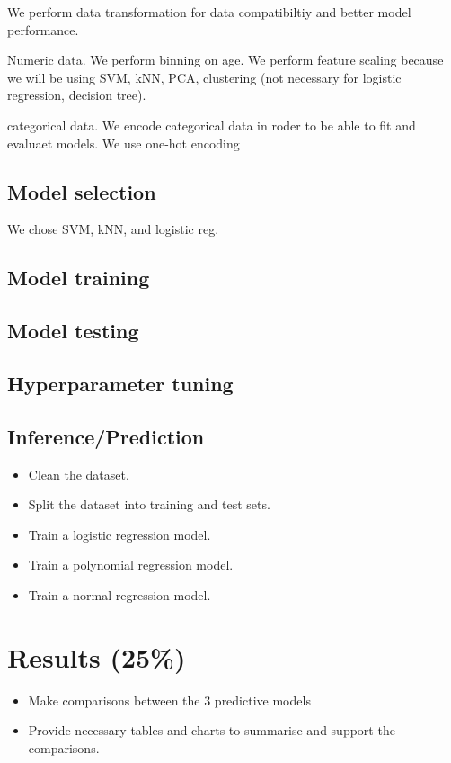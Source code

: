 \documentclass[twoside,11pt]{article}
\begin{document}
We perform data transformation for data compatibiltiy and better model performance.

Numeric data. We perform binning on age. We perform feature scaling because we will be using SVM, kNN, PCA, clustering (not necessary for logistic regression, decision tree). 

categorical data. We encode categorical data in roder to be able to fit and evaluaet models. We use one-hot encoding

\subsection{Model selection}
We chose SVM, kNN, and logistic reg.

\subsection{Model training}
\subsection{Model testing}
\subsection{Hyperparameter tuning}
\subsection{Inference/Prediction}
\begin{itemize}
    \item Clean the dataset.
    \item Split the dataset into training and test sets.
    \item Train a logistic regression model.
    \item Train a polynomial regression model.
    \item Train a normal regression model.
\end{itemize}

\section{Results (25\%)}
\begin{itemize}
    \item Make comparisons between the 3 predictive models
    \item Provide necessary tables and charts to summarise and support the comparisons.
\end{itemize}
\end{document}

